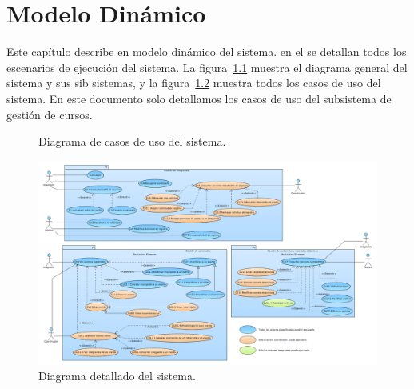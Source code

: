 \chapter{Modelo Dinámico}	
\label{cap:modDinamico}

	Este capítulo describe en modelo dinámico del sistema. en el se detallan todos los escenarios de ejecución del sistema. La figura~\ref{fig:casosDeUso} muestra el diagrama general del sistema y sus sib sistemas, y la figura~\ref{fig:casosDeUsoDetalle} muestra todos los casos de uso del sistema. En este documento solo detallamos los casos de uso del subsistema de gestión de cursos.
	
\begin{figure}[htbp]
	\begin{center}
		\caption{Diagrama de casos de uso del sistema.}
		\label{fig:casosDeUso}
	\end{center}
\end{figure}

\begin{figure}[htbp]
	\begin{center}
		\includegraphics[angle=90, width=.7\textwidth]{images/casosDeUsoDetalle}
		\caption{Diagrama detallado del sistema.}
		\label{fig:casosDeUsoDetalle}
	\end{center}
\end{figure}

